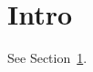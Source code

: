 \documentclass{article}
\begin{document}
\section{Intro}\label{sec:intro}
See Section~\ref{sec:intro}.
\end{document}
